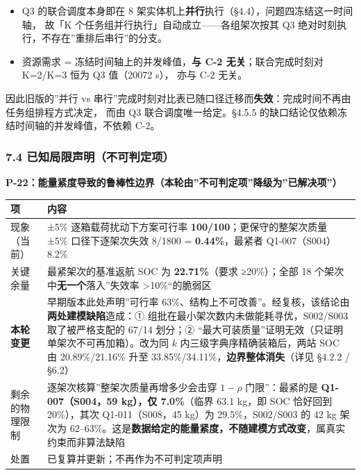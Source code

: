 \documentclass[
  10.5pt,
]{article}
\newcounter{none} %
\providecommand{\tightlist}{%
  \setlength{\itemsep}{0pt}\setlength{\parskip}{0pt}}
\begin{document}
\begin{itemize}
\tightlist
\item
  Q3 的联合调度本身即在 8
  架实体机上\textbf{并行}执行（§4.4），问题四冻结这一时间轴， 故「K
  个任务组并行执行」自动成立------各组架次按其 Q3
  绝对时刻执行，不存在''重排后串行''的分支。
\item
  资源需求 = 冻结时间轴上的并发峰值，\textbf{与 C-2
  无关}；联合完成时刻对 K=2/K=3 恒为 Q3 值（20072 s）， 亦与 C-2 无关。
\end{itemize}

因此旧版的''并行 vs
串行''完成时刻对比表已随口径迁移而\textbf{失效}：完成时间不再由任务组排程方式决定，
而由 Q3 联合调度唯一给定。§4.5.5
的缺口结论仅依赖冻结时间轴的并发峰值，不依赖 C-2。

\subsubsection{7.4
已知局限声明（不可判定项）}\label{ux5df2ux77e5ux5c40ux9650ux58f0ux660eux4e0dux53efux5224ux5b9aux9879}

\textbf{P-22：能量紧度导致的鲁棒性边界（本轮由''不可判定项''降级为''已解决项''）}

{\def\LTcaptype{none} %
\begin{longtable}[]{@{}
  >{\raggedright\arraybackslash}p{}
  >{\raggedright\arraybackslash}p{}@{}}
\toprule\noalign{}
\begin{minipage}[b]{\linewidth}\raggedright
项
\end{minipage} & \begin{minipage}[b]{\linewidth}\raggedright
内容
\end{minipage} \\
\midrule\noalign{}
\endhead
\bottomrule\noalign{}
\endlastfoot
现象（当前） & ±5\% 逐箱载荷扰动下方案可行率
\textbf{100/100}；更保守的整架次质量 ±5\% 口径下逐架次失效 8/1800 =
\textbf{0.44\%}，最紧者 Q1-007（S004）8.2\% \\
关键余量 & 最紧架次的基准返航 SOC 为 \textbf{22.71\%}（要求
≥20\%）；全部 18 个架次中\textbf{无一个}落入''失效率
\textgreater10\%``的脆弱区 \\
\textbf{本轮变更} & 早期版本此处声明''可行率
63\%、结构上不可改善''。经复核，该结论由\textbf{两处建模缺陷}造成：①
组批在最小架次数内未做能耗寻优，S002/S003 取了被严格支配的 67/14 划分；②
``最大可装质量''证明无效（只证明单架次不可再加箱）。改为同 \(k\)
内三级字典序精确装箱后，两站 SOC 由 20.89\%/21.16\% 升至
33.85\%/34.11\%，\textbf{边界整体消失}（详见 §4.2.2 / §6.2） \\
剩余的物理限制 & 逐架次核算''整架次质量再增多少会击穿 \(1-\rho\)
门限''：最紧的是 \textbf{Q1-007（S004，59 kg），仅 7.0\%}（临界 63.1
kg，即 SOC 恰好回到 20\%），其次 Q1-011（S008，45 kg）为
29.5\%，S002/S003 的 42 kg 架次为
62--63\%。这是\textbf{数据给定的能量紧度，不随建模方式改变}，属真实约束而非算法缺陷 \\
处置 & 已复算并更新；不再作为不可判定项声明 \\
\end{longtable}
}
\end{document}
